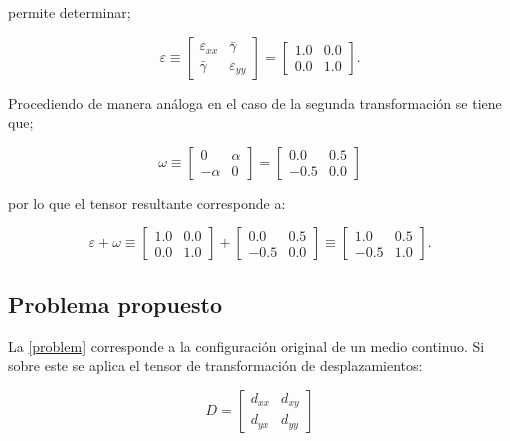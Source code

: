 \documentclass[../notas medios.tex]{subfiles}
\begin{document}
permite determinar;

\[\varepsilon \equiv \left[ {\begin{array}{*{20}{c}}
{{\varepsilon _{xx}}}&\bar{\gamma}\\
\bar{\gamma} &{{\varepsilon _{yy}}}
\end{array}} \right] = \left[ {\begin{array}{*{20}{c}}
{1.0}&{0.0}\\
{0.0}&{1.0}
\end{array}} \right].\]

Procediendo de manera análoga en el caso de la segunda transformación se tiene que;

\[\omega  \equiv \left[ {\begin{array}{*{20}{c}}
0&\alpha \\
{ - \alpha }&0
\end{array}} \right] = \left[ {\begin{array}{*{20}{c}}
{0.0}&{0.5}\\
{ - 0.5}&{0.0}
\end{array}} \right]\]

por lo que el tensor resultante corresponde a:

\[\varepsilon  + \omega  \equiv \left[ {\begin{array}{*{20}{c}}
{1.0}&{0.0}\\
{0.0}&{1.0}
\end{array}} \right] + \left[ {\begin{array}{*{20}{c}}
{0.0}&{0.5}\\
{ - 0.5}&{0.0}
\end{array}} \right] \equiv \left[ {\begin{array}{*{20}{c}}
{1.0}&{0.5}\\
{ - 0.5}&{1.0}
\end{array}} \right].\]



\subsection*{Problema propuesto}

La \cref{problem} corresponde a la configuración original de un medio continuo. Si sobre este se aplica el tensor de transformación de desplazamientos:

\[D = \left[ {\begin{array}{*{20}{c}}
{{d_{xx}}}&{{d_{xy}}}\\
{{d_{yx}}}&{{d_{yy}}}
\end{array}} \right]\]
\end{document}
